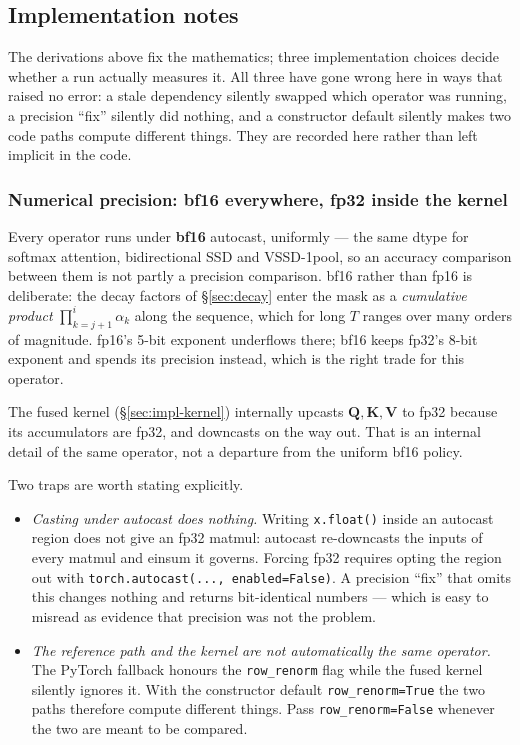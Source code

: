 \documentclass[11pt,a4paper]{article}
\begin{document}
\subsection{Implementation notes}
\label{sec:impl}

The derivations above fix the mathematics; three implementation choices decide
whether a run actually measures it. All three have gone wrong here in ways that
raised no error: a stale dependency silently swapped which operator was running,
a precision ``fix'' silently did nothing, and a constructor default silently
makes two code paths compute different things. They are recorded here rather
than left implicit in the code.

\subsubsection{Numerical precision: bf16 everywhere, fp32 inside the kernel}
\label{sec:impl-precision}

Every operator runs under \textbf{bf16} autocast, uniformly --- the same dtype
for softmax attention, bidirectional SSD and VSSD-1pool, so an accuracy comparison
between them is not partly a precision comparison. bf16 rather than fp16 is
deliberate: the decay factors of \S\ref{sec:decay} enter the mask as a
\emph{cumulative product} $\prod_{k=j+1}^{i}\alpha_k$ along the sequence, which
for long $T$ ranges over many orders of magnitude. fp16's 5-bit exponent
underflows there; bf16 keeps fp32's 8-bit exponent and spends its precision
instead, which is the right trade for this operator.

The fused kernel (\S\ref{sec:impl-kernel}) internally upcasts $\bm{Q},\bm{K},
\bm{V}$ to fp32 because its accumulators are fp32, and downcasts on the way out.
That is an internal detail of the same operator, not a departure from the
uniform bf16 policy.

Two traps are worth stating explicitly.
\begin{itemize}
  \item \emph{Casting under autocast does nothing.} Writing \verb|x.float()|
        inside an autocast region does not give an fp32 matmul: autocast
        re-downcasts the inputs of every matmul and einsum it governs. Forcing
        fp32 requires opting the region out with
        \verb|torch.autocast(..., enabled=False)|. A precision ``fix'' that
        omits this changes nothing and returns bit-identical numbers --- which
        is easy to misread as evidence that precision was not the problem.
  \item \emph{The reference path and the kernel are not automatically the same
        operator.} The PyTorch fallback honours the \verb|row_renorm| flag while
        the fused kernel silently ignores it. With the constructor default
        \verb|row_renorm=True| the two paths therefore compute different things.
        Pass \verb|row_renorm=False| whenever the two are meant to be compared.
\end{itemize}
\end{document}
